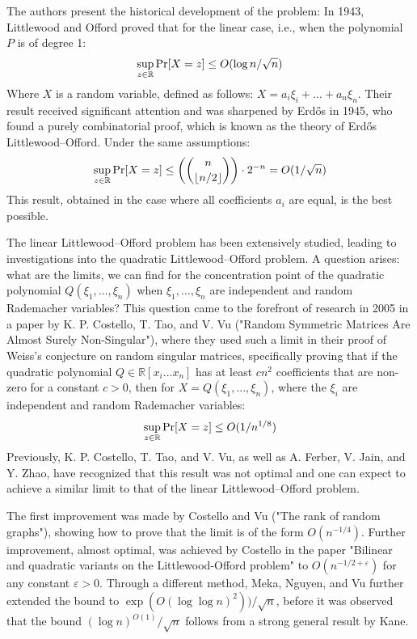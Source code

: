 The authors present the historical development of the problem:
\newline
In 1943, Littlewood and Offord proved that for the linear case, i.e., when the polynomial $P$ is of degree 1:
\vspace{-0.4\baselineskip}
\[ \sup_{z\in\mathbb{R}} \Pr[X=z] \leq O(\log n/\sqrt{n}) \vspace{-0.8\baselineskip} \]
\newline
Where $X$ is a random variable, defined as follows: $X = a_i \xi_i + \ldots + a_n \xi_n$.
\newline
Their result received significant attention and was sharpened by Erdős in 1945, who found a purely combinatorial proof, which is known as the theory of Erdős Littlewood–Offord. Under the same assumptions:
\vspace{-0.2\baselineskip}
\[ \sup_{z\in\mathbb{R}} \Pr[X=z] \leq \left( n \choose \lfloor n/2 \rfloor \right) \cdot 2^{-n} = O(1/\sqrt{n}) \vspace{-0.5\baselineskip} \]
\newline
This result, obtained in the case where all coefficients $a_i$ are equal, is the best possible.
 
The linear Littlewood–Offord problem has been extensively studied, leading to investigations into the quadratic Littlewood–Offord problem. A question arises: what are the limits, we can find for the concentration point of the quadratic polynomial $Q(\xi_1,\ldots,\xi_n)$ when $\xi_1,\ldots,\xi_n$ are independent and random Rademacher variables? This question came to the forefront of research in 2005 in a paper by K. P. Costello, T. Tao, and V. Vu ("Random Symmetric Matrices Are Almost Surely Non-Singular"), where they used such a limit in their proof of Weiss's conjecture on random singular matrices, specifically proving that if the quadratic polynomial $Q \in \mathbb{R}[x_i \ldots x_n]$ has at least $cn^2$ coefficients that are non-zero for a constant $c > 0$, then for $X = Q(\xi_1,\ldots,\xi_n)$, where the $\xi_i$ are independent and random Rademacher variables:
\vspace{-0.24\baselineskip}
\[ \sup_{z\in\mathbb{R}} \Pr[X=z] \leq O(1/n^{1/8}) \vspace{-0.27\baselineskip} \]
Previously, K. P. Costello, T. Tao, and V. Vu, as well as A. Ferber, V. Jain, and Y. Zhao, have recognized that this result was not optimal and one can expect to achieve a similar limit to that of the linear Littlewood–Offord problem.
 
The first improvement was made by Costello and Vu ("The rank of random graphs"), showing how to prove that the limit is of the form $O(n^{-1/4})$. Further improvement, almost optimal, was achieved by Costello in the paper "Bilinear and quadratic variants on the Littlewood-Offord problem" to $O(n^{-1/2+\varepsilon})$ for any constant $\varepsilon > 0$. Through a different method, Meka, Nguyen, and Vu further extended the bound to $\exp(O(\log\log n)^2))/\sqrt{n}$, before it was observed that the bound $(\log n)^{O(1)}/\sqrt{n}$ follows from a strong general result by Kane.
 
